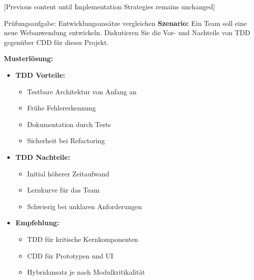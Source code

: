 [Previous content until Implementation Strategies remains unchanged]

\begin{example}{Prüfungsaufgabe: Entwicklungsansätze vergleichen}
\textbf{Szenario:}
Ein Team soll eine neue Webanwendung entwickeln. Diskutieren Sie die Vor- und Nachteile 
von TDD gegenüber CDD für dieses Projekt.

\textbf{Musterlösung:}
\begin{itemize}
    \item \textbf{TDD Vorteile:}
    \begin{itemize}
        \item Testbare Architektur von Anfang an
        \item Frühe Fehlererkennung
        \item Dokumentation durch Tests
        \item Sicherheit bei Refactoring
    \end{itemize}
    
    \item \textbf{TDD Nachteile:}
    \begin{itemize}
        \item Initial höherer Zeitaufwand
        \item Lernkurve für das Team
        \item Schwierig bei unklaren Anforderungen
    \end{itemize}
    
    \item \textbf{Empfehlung:}
    \begin{itemize}
        \item TDD für kritische Kernkomponenten
        \item CDD für Prototypen und UI
        \item Hybridansatz je nach Modulkritikalität
    \end{itemize}
\end{itemize}
\end{example}

